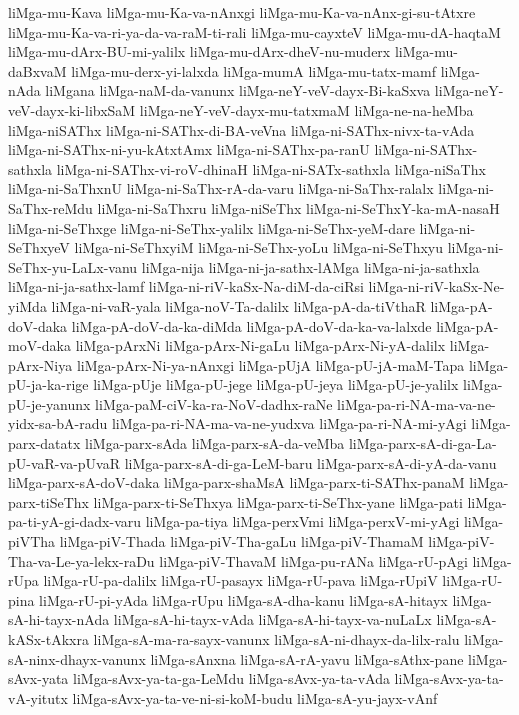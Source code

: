 {liMga-mu-Kava
liMga-mu-Ka-va-nAnxgi
liMga-mu-Ka-va-nAnx-gi-su-tAtxre
liMga-mu-Ka-va-ri-ya-da-va-raM-ti-rali
liMga-mu-cayxteV
liMga-mu-dA-haqtaM
liMga-mu-dArx-BU-mi-yalilx
liMga-mu-dArx-dheV-nu-muderx
liMga-mu-daBxvaM
liMga-mu-derx-yi-lalxda
liMga-mumA
liMga-mu-tatx-mamf
liMga-nAda
liMgana
liMga-naM-da-vanunx
liMga-neY-veV-dayx-Bi-kaSxva
liMga-neY-veV-dayx-ki-libxSaM
liMga-neY-veV-dayx-mu-tatxmaM
liMga-ne-na-heMba
liMga-niSAThx
liMga-ni-SAThx-di-BA-veVna
liMga-ni-SAThx-nivx-ta-vAda
liMga-ni-SAThx-ni-yu-kAtxtAmx
liMga-ni-SAThx-pa-ranU
liMga-ni-SAThx-sathxla
liMga-ni-SAThx-vi-roV-dhinaH
liMga-ni-SATx-sathxla
liMga-niSaThx
liMga-ni-SaThxnU
liMga-ni-SaThx-rA-da-varu
liMga-ni-SaThx-ralalx
liMga-ni-SaThx-reMdu
liMga-ni-SaThxru
liMga-niSeThx
liMga-ni-SeThxY-ka-mA-nasaH
liMga-ni-SeThxge
liMga-ni-SeThx-yalilx
liMga-ni-SeThx-yeM-dare
liMga-ni-SeThxyeV
liMga-ni-SeThxyiM
liMga-ni-SeThx-yoLu
liMga-ni-SeThxyu
liMga-ni-SeThx-yu-LaLx-vanu
liMga-nija
liMga-ni-ja-sathx-lAMga
liMga-ni-ja-sathxla
liMga-ni-ja-sathx-lamf
liMga-ni-riV-kaSx-Na-diM-da-ciRsi
liMga-ni-riV-kaSx-Ne-yiMda
liMga-ni-vaR-yala
liMga-noV-Ta-dalilx
liMga-pA-da-tiVthaR
liMga-pA-doV-daka
liMga-pA-doV-da-ka-diMda
liMga-pA-doV-da-ka-va-lalxde
liMga-pA-moV-daka
liMga-pArxNi
liMga-pArx-Ni-gaLu
liMga-pArx-Ni-yA-dalilx
liMga-pArx-Niya
liMga-pArx-Ni-ya-nAnxgi
liMga-pUjA
liMga-pU-jA-maM-Tapa
liMga-pU-ja-ka-rige
liMga-pUje
liMga-pU-jege
liMga-pU-jeya
liMga-pU-je-yalilx
liMga-pU-je-yanunx
liMga-paM-ciV-ka-ra-NoV-dadhx-raNe
liMga-pa-ri-NA-ma-va-ne-yidx-sa-bA-radu
liMga-pa-ri-NA-ma-va-ne-yudxva
liMga-pa-ri-NA-mi-yAgi
liMga-parx-datatx
liMga-parx-sAda
liMga-parx-sA-da-veMba
liMga-parx-sA-di-ga-La-pU-vaR-va-pUvaR
liMga-parx-sA-di-ga-LeM-baru
liMga-parx-sA-di-yA-da-vanu
liMga-parx-sA-doV-daka
liMga-parx-shaMsA
liMga-parx-ti-SAThx-panaM
liMga-parx-tiSeThx
liMga-parx-ti-SeThxya
liMga-parx-ti-SeThx-yane
liMga-pati
liMga-pa-ti-yA-gi-dadx-varu
liMga-pa-tiya
liMga-perxVmi
liMga-perxV-mi-yAgi
liMga-piVTha
liMga-piV-Thada
liMga-piV-Tha-gaLu
liMga-piV-ThamaM
liMga-piV-Tha-va-Le-ya-lekx-raDu
liMga-piV-ThavaM
liMga-pu-rANa
liMga-rU-pAgi
liMga-rUpa
liMga-rU-pa-dalilx
liMga-rU-pasayx
liMga-rU-pava
liMga-rUpiV
liMga-rU-pina
liMga-rU-pi-yAda
liMga-rUpu
liMga-sA-dha-kanu
liMga-sA-hitayx
liMga-sA-hi-tayx-nAda
liMga-sA-hi-tayx-vAda
liMga-sA-hi-tayx-va-nuLaLx
liMga-sA-kASx-tAkxra
liMga-sA-ma-ra-sayx-vanunx
liMga-sA-ni-dhayx-da-lilx-ralu
liMga-sA-ninx-dhayx-vanunx
liMga-sAnxna
liMga-sA-rA-yavu
liMga-sAthx-pane
liMga-sAvx-yata
liMga-sAvx-ya-ta-ga-LeMdu
liMga-sAvx-ya-ta-vAda
liMga-sAvx-ya-ta-vA-yitutx
liMga-sAvx-ya-ta-ve-ni-si-koM-budu
liMga-sA-yu-jayx-vAnf
}
